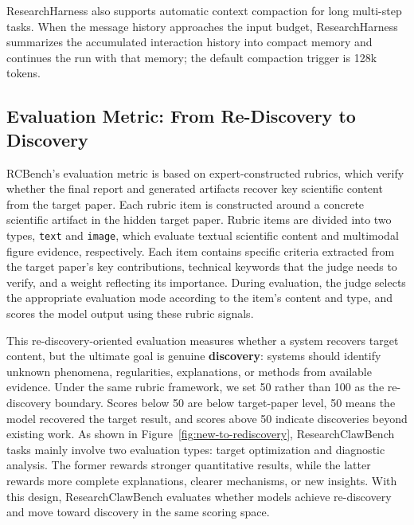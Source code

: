 ResearchHarness also supports automatic context compaction for long multi-step tasks. When the message history approaches the input budget, ResearchHarness summarizes the accumulated interaction history into compact memory and continues the run with that memory; the default compaction trigger is 128k tokens.


\subsection{Evaluation Metric: From Re-Discovery to Discovery}

RCBench's evaluation metric is based on expert-constructed rubrics, which verify whether the final report and generated artifacts recover key scientific content from the target paper. Each rubric item is constructed around a concrete scientific artifact in the hidden target paper. Rubric items are divided into two types, \texttt{text} and \texttt{image}, which evaluate textual scientific content and multimodal figure evidence, respectively. Each item contains specific criteria extracted from the target paper's key contributions, technical keywords that the judge needs to verify, and a weight reflecting its importance. During evaluation, the judge selects the appropriate evaluation mode according to the item's content and type, and scores the model output using these rubric signals.

This re-discovery-oriented evaluation measures whether a system recovers target content, but the ultimate goal is genuine \textbf{discovery}: systems should identify unknown phenomena, regularities, explanations, or methods from available evidence. Under the same rubric framework, we set 50 rather than 100 as the re-discovery boundary. Scores below 50 are below target-paper level, 50 means the model recovered the target result, and scores above 50 indicate discoveries beyond existing work. As shown in Figure~\ref{fig:new-to-rediscovery}, ResearchClawBench tasks mainly involve two evaluation types: target optimization and diagnostic analysis. The former rewards stronger quantitative results, while the latter rewards more complete explanations, clearer mechanisms, or new insights. With this design, ResearchClawBench evaluates whether models achieve re-discovery and move toward discovery in the same scoring space.
